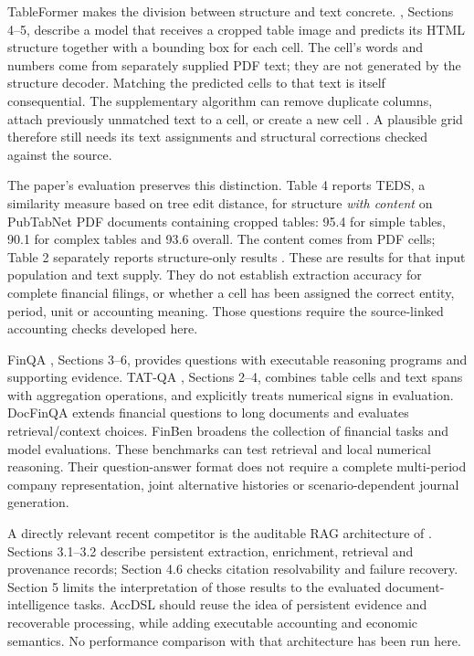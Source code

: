 \enlargethispage{\baselineskip}
TableFormer makes the division between structure and text concrete.
\citet{nassar2022tableformer}, Sections 4--5, describe a model that receives a
cropped table image and predicts its HTML structure together with a bounding
box for each cell. The cell's words and numbers come from separately supplied
PDF text; they are not generated by the structure decoder. Matching the
predicted cells to that text is itself consequential. The supplementary
algorithm can remove duplicate columns, attach previously unmatched text to a
cell, or create a new cell \citep[Section 2]{nassar2022tableformersupp}. A
plausible grid therefore still needs its text assignments and structural
corrections checked against the source.

The paper's evaluation preserves this distinction. Table 4 reports TEDS,
a similarity measure based on tree edit distance, for structure \emph{with
content} on PubTabNet PDF documents containing cropped tables: 95.4 for simple
tables, 90.1 for complex tables and 93.6 overall. The content comes from PDF
cells; Table 2 separately reports structure-only results
\citep[Tables 2 and 4, p.~4620]{nassar2022tableformer}. These are results for
that input population and text supply. They do not establish extraction
accuracy for complete financial filings, or whether a cell has been assigned
the correct entity, period, unit or accounting meaning. Those questions require
the source-linked accounting checks developed here.


FinQA \citep{chen2021}, Sections 3--6, provides questions with executable
reasoning programs and supporting evidence. TAT-QA \citep{zhu2021}, Sections
2--4, combines table cells and text spans with aggregation operations, and
explicitly treats numerical signs in evaluation. DocFinQA \citep{reddy2024}
extends financial questions to long documents and evaluates retrieval/context
choices. FinBen \citep{xie2024} broadens the collection of financial tasks and
model evaluations. These benchmarks can test retrieval and local numerical
reasoning. Their question-answer format does not require a complete
multi-period company representation, joint alternative histories or
scenario-dependent journal generation.

A directly relevant recent competitor is the auditable RAG architecture of
\citet{cosentino2026}. Sections 3.1--3.2 describe persistent extraction,
enrichment, retrieval and provenance records; Section 4.6 checks citation
resolvability and failure recovery. Section 5 limits the interpretation of
those results to the evaluated document-intelligence tasks. AccDSL should
reuse the idea of persistent evidence and recoverable processing, while adding
executable accounting and economic semantics. No performance comparison with
that architecture has been run here.

